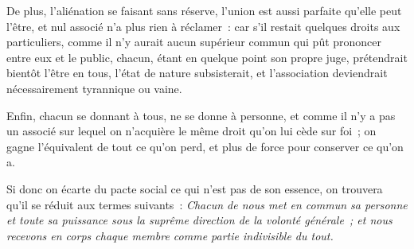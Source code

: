 \documentclass[french,twoside]{book} %
\begin{document}
De plus, l’aliénation se faisant sans réserve, l’union est aussi parfaite qu’elle peut l’être, et nul associé n’a plus rien à réclamer : car s’il restait quelques droits aux particuliers, comme il n’y aurait aucun supérieur commun qui pût prononcer entre eux et le public, chacun, étant en quelque point son propre juge, prétendrait bientôt l’être en tous, l’état de nature subsisterait, et l’association deviendrait nécessairement tyrannique ou vaine.\par
Enfin, chacun se donnant à tous, ne se donne à personne, et comme il n’y a pas un associé sur lequel on n’acquière le même droit qu’on lui cède sur foi ; on gagne l’équivalent de tout ce qu’on perd, et plus de force pour conserver ce qu’on a.\par
Si donc on écarte du pacte social ce qui n’est pas de son essence, on trouvera qu’il se réduit aux termes suivants : {\itshape Chacun de nous met en commun sa personne et toute sa puissance sous la suprême direction de la volonté générale ; et nous recevons en corps chaque membre comme partie indivisible du tout.}\par
\end{document}
